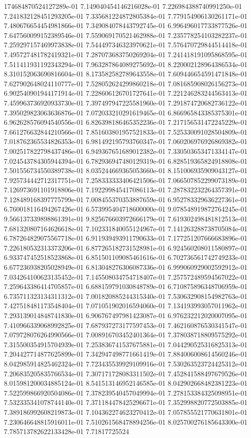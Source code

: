 174684870524127289e-01	7.149040454146216028e-01	7.226984388740991250e-01	7.241832128451293205e-01	7.335681224872805384e-01	7.779154906130261171e-01	7.480676654454981866e-01	7.349084078443792745e-01	6.996496017733877526e-01	7.647560099152389546e-01	7.559069170521462988e-01	7.235778254103282237e-01	7.259297157469973838e-01	7.544497346323970621e-01	7.576470729844514418e-01	7.495727481782419321e-01	7.287073683750269204e-01	7.241418191095868595e-01	7.511411931192343294e-01	7.963287864089275692e-01	8.220002128964386534e-01	8.310152063690816604e-01	8.173582582789643558e-01	7.609446654591471848e-01	7.627902648024110777e-01	7.528052624299860218e-01	7.081685908026156273e-01	6.902540901944171914e-01	7.228606126701727641e-01	7.221246283244563413e-01	7.459963736920933730e-01	7.397497947225581960e-01	7.291874720682736122e-01	7.395029823063636876e-01	7.072033210291619465e-01	6.866965843385375301e-01	6.962628576094540556e-01	6.826398186465352236e-01	7.217156531472245229e-01	7.661276632844210566e-01	7.851603801957521833e-01	7.525330091028504809e-01	7.018762365534826353e-01	6.981492195793760347e-01	7.060206976926869382e-01	7.002517822798437486e-01	6.949367651689012382e-01	7.330503653471334147e-01	7.024543784305944394e-01	6.782936947480129319e-01	6.828519365824918808e-01	7.501556734550389738e-01	8.035244669365053660e-01	8.151006935909043127e-01	7.925734442712317751e-01	7.258333333406421506e-01	7.066507852299073189e-01	7.126973691101918806e-01	7.192299845417086113e-01	7.287832232264357391e-01	7.128489168397775799e-01	7.008455370353887659e-01	6.952783329636227361e-01	6.760018116494267426e-01	6.573995404718600000e-01	9.078548919872764245e-01	9.566137339898861391e-01	9.825676603972666179e-01	7.619302498481812513e-01	7.681320807164626618e-01	7.102331840055124967e-01	7.141263288738705084e-01	6.787264829075567718e-01	6.911939493911790633e-01	7.177251207666683896e-01	7.226180532313373206e-01	6.877265182731528981e-01	6.924560208011580897e-01	6.933747452518523868e-01	6.851501109085461616e-01	6.702736561742749233e-01	6.677236938205028949e-01	6.813048276306087336e-01	6.999060929002592912e-01	7.034264100623135452e-01	7.145508034754718407e-01	7.257572489594567022e-01	7.259643386414705857e-01	6.688159791030848789e-01	6.710875896348706959e-01	6.735711323134311312e-01	7.001820885244315340e-01	7.530632908154982763e-01	7.427518481173548404e-01	7.071051902016594060e-01	7.134193993057011962e-01	7.293139014848741830e-01	6.906767497981423087e-01	6.976232212020007095e-01	7.410966339068992825e-01	7.687937273177597453e-01	7.462160876530341547e-01	7.079728076264990566e-01	7.008916703452401364e-01	7.378038718809575292e-01	7.315500354915704939e-01	7.253836741537675881e-01	7.044290525316825313e-01	7.204427714877625899e-01	7.342947498771661419e-01	7.884006008614560246e-01	8.042985914825462324e-01	7.723435539929109916e-01	7.530263523724425312e-01	7.206835205835766534e-01	7.307171728083311502e-01	7.452841588497679526e-01	8.015981200034885124e-01	8.541513146952146585e-01	8.042902668482381223e-01	7.522599866920504086e-01	7.378239540457049994e-01	7.278153384325098951e-01	7.532335341078744140e-01	7.371184478425296671e-01	7.352998820772503885e-01	7.389186992608219873e-01	7.104362274623270412e-01	7.057855521770631801e-01	7.230646648815916011e-01	7.510261568478894256e-01	8.025700276185643300e-01	7.785713782622133428e-01	7.71817725524